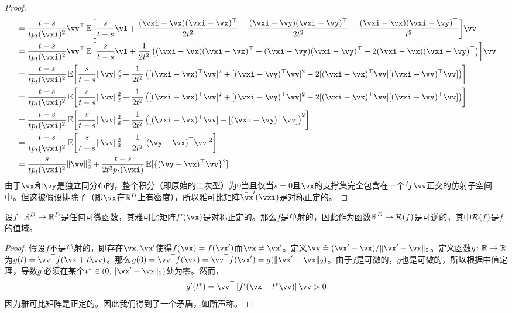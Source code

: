 \documentclass[../../book-main_zh.tex]{subfiles}
\begin{document}
\begin{proof}
\begin{align}
        &= \frac{t - s}{tp_{t}(\vxi)^{2}}\vv^{\top}\Ex\rs{\frac{s}{t - s}\vI +\frac{(\vxi - \vx)(\vxi - \vx)^{\top}}{2t^{2}} + \frac{(\vxi - \vy)(\vxi - \vy)^{\top}}{2t^{2}} - \frac{(\vxi - \vx)(\vxi - \vy)^{\top}}{t^{2}}}\vv \\
        &= \frac{t - s}{tp_{t}(\vxi)^{2}}\vv^{\top}\Ex\rs{\frac{s}{t - s}\vI +\frac{1}{2t^{2}}\bp{(\vxi - \vx)(\vxi - \vx)^{\top} + (\vxi - \vy)(\vxi - \vy)^{\top} - 2(\vxi - \vx)(\vxi - \vy)^{\top}}}\vv \\
        &= \frac{t - s}{tp_{t}(\vxi)^{2}}\Ex\rs{\frac{s}{t - s}\norm{\vv}_{2}^{2} +\frac{1}{2t^{2}}\bp{[(\vxi - \vx)^{\top}\vv]^{2} + [(\vxi - \vy)^{\top}\vv]^{2} - 2[(\vxi - \vx)^{\top}\vv][(\vxi - \vy)^{\top}\vv]}} \\
        &= \frac{t - s}{tp_{t}(\vxi)^{2}}\Ex\rs{\frac{s}{t - s}\norm{\vv}_{2}^{2} +\frac{1}{2t^{2}}\bp{[(\vxi - \vx)^{\top}\vv]^{2} + [(\vxi - \vy)^{\top}\vv]^{2} - 2[(\vxi - \vx)^{\top}\vv][(\vxi - \vy)^{\top}\vv]}} \\
        &= \frac{t - s}{tp_{t}(\vxi)^{2}}\Ex\rs{\frac{s}{t - s}\norm{\vv}_{2}^{2} +\frac{1}{2t^{2}}\bp{[(\vxi - \vx)^{\top}\vv] - [(\vxi - \vy)^{\top}\vv]}^{2}} \\
        &= \frac{t - s}{tp_{t}(\vxi)^{2}}\Ex\rs{\frac{s}{t - s}\norm{\vv}_{2}^{2} +\frac{1}{2t^{2}}[(\vy - \vx)^{\top}\vv]^{2}} \\
        &= \frac{s}{tp_{t}(\vxi)^{2}}\norm{\vv}_{2}^{2} + \frac{t - s}{2t^{3}p_{t}(\vxi)}\Ex[\{(\vy - \vx)^{\top}\vv\}^{2}]
    \end{align}
    由于\(\vx\)和\(\vy\)是独立同分布的，整个积分（即原始的二次型）为\(0\)当且仅当\(s = 0\)且\(\vx\)的支撑集完全包含在一个与\(\vv\)正交的仿射子空间中。但这被假设排除了（即\(\vx\)在\(\mathbb{R}^{D}\)上有密度），所以雅可比矩阵\(\bar{\vx}^{\prime}(\vxi)\)是对称正定的。
\end{proof}

\begin{lemma}\label{lem:gribonval_A2}
    设\(f \colon \mathbb{R}^{D} \to \mathbb{R}^{D}\)是任何可微函数，其雅可比矩阵\(f^{\prime}(\vx)\)是对称正定的。那么\(f\)是单射的，因此作为函数\(\mathbb{R}^{D} \to \mathcal{R}(f)\)是可逆的，其中\(\mathcal{R}(f)\)是\(f\)的值域。
\end{lemma}
\begin{proof}
    假设\(f\)不是单射的，即存在\(\vx, \vx^{\prime}\)使得\(f(\vx) = f(\vx^{\prime})\)而\(\vx \neq \vx^{\prime}\)。定义\(\vv \doteq (\vx^{\prime} - \vx)/\norm{\vx^{\prime} - \vx}_{2}\)。定义函数\(g \colon \mathbb{R} \to \mathbb{R}\)为\(g(t) \doteq \vv^{\top}f(\vx + t\vv)\)。那么\(g(0) = \vv^{\top}f(\vx) = \vv^{\top}f(\vx^{\prime}) = g(\norm{\vx^{\prime} - \vx}_{2})\)。由于\(f\)是可微的，\(g\)也是可微的，所以根据中值定理，导数\(g^{\prime}\)必须在某个\(t^{\ast} \in (0, \norm{\vx^{\prime} - \vx}_{2})\)处为零。然而，
    \begin{equation}
        g^{\prime}(t^{\ast}) \doteq \vv^{\top}\bs{f^{\prime}(\vx + t^{\ast}\vv)}\vv > 0
    \end{equation}
    因为雅可比矩阵是正定的。因此我们得到了一个矛盾，如所声称。
\end{proof}
\end{document}
